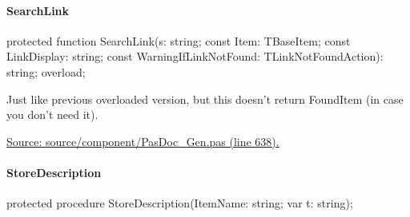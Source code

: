 \documentclass{report}
\newif\ifpdf
\begin{document}
\paragraph*{SearchLink}\hspace*{\fill}

\label{PasDoc_Gen.TDocGenerator-SearchLink}
\begin{list}{}{
\setlength{\itemindent}{0cm}
\setlength{\listparindent}{0cm}
\setlength{\leftmargin}{\evensidemargin}
\addtolength{\leftmargin}{\tmplength}
\settowidth{\labelsep}{X}
\addtolength{\leftmargin}{\labelsep}
\setlength{\labelwidth}{\tmplength}
}
\item[\textbf{Declaration}\hfill]
\ifpdf
\begin{flushleft}
\fi
\begin{ttfamily}
protected function SearchLink(s: string; const Item: TBaseItem; const LinkDisplay: string; const WarningIfLinkNotFound: TLinkNotFoundAction): string; overload;\end{ttfamily}

\ifpdf
\end{flushleft}
\fi

\par
\item[\textbf{Description}]
Just like previous overloaded version, but this doesn't return FoundItem (in case you don't need it).\par
\href{https://github.com/pasdoc/pasdoc/blob/master/source/component/PasDoc_Gen.pas#L638}{Source: source/component/PasDoc{\_}Gen.pas (line 638).}

\end{list}
\paragraph*{StoreDescription}\hspace*{\fill}

\label{PasDoc_Gen.TDocGenerator-StoreDescription}
\begin{list}{}{
\setlength{\itemindent}{0cm}
\setlength{\listparindent}{0cm}
\setlength{\leftmargin}{\evensidemargin}
\addtolength{\leftmargin}{\tmplength}
\settowidth{\labelsep}{X}
\addtolength{\leftmargin}{\labelsep}
\setlength{\labelwidth}{\tmplength}
}
\item[\textbf{Declaration}\hfill]
\ifpdf
\begin{flushleft}
\fi
\begin{ttfamily}
protected procedure StoreDescription(ItemName: string; var t: string);\end{ttfamily}

\ifpdf
\end{flushleft}
\fi

\end{list}
\end{document}
